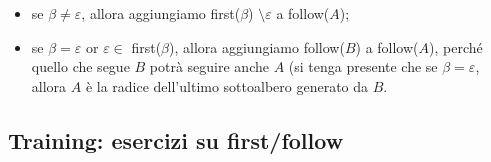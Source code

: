 \documentclass[class=book, crop=false, oneside, 12pt]{standalone}
\begin{document}
\begin{itemize}
    \item se \(\beta \neq \varepsilon\), allora aggiungiamo first(\(\beta\)) \(\setminus \varepsilon\) a follow(\(A\));
    \item se \(\beta = \varepsilon\) or \(\varepsilon \in\) first(\(\beta\)), allora aggiungiamo follow(\(B\)) a follow(\(A\)), perché quello che segue \(B\) potrà seguire anche \(A\) (si tenga presente che se \(\beta = \varepsilon\), allora \(A\) è la radice dell'ultimo sottoalbero generato da \(B\).
\end{itemize}   
\subsection{Training: esercizi su first/follow}
\end{document}

